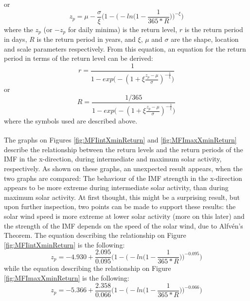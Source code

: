 \documentclass[11pt]{article}
\begin{document}
        or
        \begin{equation}
            z_p = \mu-\frac{\sigma}{\xi}\Bigg( 1-\Bigg( -ln\Bigg( 1-\frac{1}{365*R}\Bigg) \Bigg) ^{-\xi}\Bigg)
        \end{equation}
        where the $z_p$ (or $-z_p$ for daily minima) is the return level, $r$ is the return period in days, $R$ is the return period in years, and $\xi$, $\mu$ and $\sigma$ are the shape, location and scale parameters respectively. From this equation, an equation for the return period in terms of the return level can be derived:
        \begin{equation}
            r=\frac{1}{1-exp\Bigg( -(1+\xi \frac{z_p-\mu}{\sigma})^{-\frac{1}{\xi}}\Bigg) }
        \end{equation}
        or
        \begin{equation}
            R=\frac{1/365}{1-exp\Bigg( -(1+\xi \frac{z_p-\mu}{\sigma})^{-\frac{1}{\xi}}\Bigg) }
        \end{equation}
        where the symbols used are described above.\\ \\
        The graphs on Figures \ref{fig:MFIintXminReturn} and \ref{fig:MFImaxXminReturn} describe the relationship between the return levels and the return periods of the IMF in the x-direction, during intermediate and maximum solar activity, respectively. As shown on these graphs, an unexpected result appears, when the two graphs are compared: The behaviour of the IMF strength in the x-direction appears to be more extreme during intermediate solar activity, than during maximum solar activity. At first thought, this might be a surprising result, but upon further inspection, two points can be made to support these results: the solar wind speed is more extreme at lower solar activity (more on this later) and the strength of the IMF depends on the speed of the solar wind, due to Alfvén's Theorem\cite{1976alfven}.
        The equation describing the relationship on Figure \ref{fig:MFIintXminReturn} is the following:
        \begin{equation}
            z_p =-4.930+\frac{2.095}{0.095}\Bigg( 1-\Bigg( -ln\Bigg( 1-\frac{1}{365*R}\Bigg) \Bigg) ^{-0.095}\Bigg)
        \end{equation}
        while the equation describing the relationship on Figure \ref{fig:MFImaxXminReturn} is the following:
        \begin{equation}
            z_p = -5.366+\frac{2.358}{0.066}\Bigg( 1-\Bigg( -ln\Bigg( 1-\frac{1}{365*R}\Bigg) \Bigg) ^{-0.066}\Bigg)
        \end{equation}\\ \\
\end{document}
